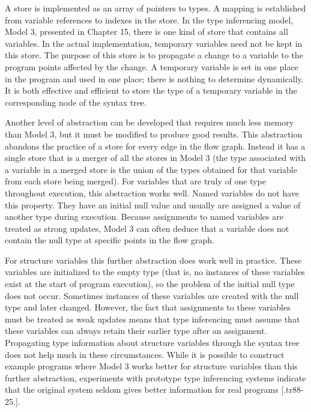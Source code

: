 A store is implemented as an array of pointers to types. A mapping is
established from variable references to indexes in the store. In the
type inferencing model, Model 3, presented in Chapter 15, there is one
kind of store that contains all variables. In the actual
implementation, temporary variables need not be kept in this
store. The purpose of this store is to propagate a change to a
variable to the program points affected by the change. A temporary
variable is set in one place in the program and used in one place;
there is nothing to determine dynamically. It is both effective and
efficient to store the type of a temporary variable in the
corresponding node of the syntax tree.

Another level of abstraction can be developed that requires much less
memory than Model 3, but it must be modified to produce good
results. This abstraction abandons the practice of a store for every
edge in the flow graph. Instead it has a single store that is a merger
of all the stores in Model 3 (the type associated with a variable in a
merged store is the union of the types obtained for that variable from
each store being merged). For variables that are truly of one type
throughout execution, this abstraction works well. Named variables do
not have this property. They have an initial null value and usually
are assigned a value of another type during execution. Because
assignments to named variables are treated as strong updates, Model 3
can often deduce that a variable does not contain the null type at
specific points in the flow graph.

For structure variables this further abstraction does work well in
practice. These variables are initialized to the empty type (that is,
no instances of these variables exist at the start of program
execution), so the problem of the initial null type does not
occur. Sometimes instances of these variables are created with the
null type and later changed. However, the fact that assignments to
these variables must be treated as weak updates means that type
inferencing must assume that these variables can always retain their
earlier type after an assignment. Propagating type information about
structure variables through the syntax tree does not help much in
these circumstances. While it is possible to construct example
programs where Model 3 works better for structure variables than this
further abstraction, experiments with prototype type inferencing
systems indicate that the original system seldom gives better
information for real programs [.tr88-25.].

